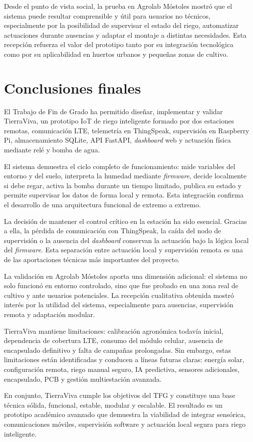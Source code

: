 Desde el punto de vista social, la prueba en Agrolab Móstoles mostró que el sistema puede resultar comprensible y útil para usuarios no técnicos, especialmente por la posibilidad de supervisar el estado del riego, automatizar actuaciones durante ausencias y adaptar el montaje a distintas necesidades. Esta recepción refuerza el valor del prototipo tanto por su integración tecnológica como por su aplicabilidad en huertos urbanos y pequeñas zonas de cultivo.

\section{Conclusiones finales}
\label{sec:conclusiones_finales}

El Trabajo de Fin de Grado ha permitido diseñar, implementar y validar TierraViva, un prototipo IoT de riego inteligente formado por dos estaciones remotas, comunicación LTE, telemetría en ThingSpeak, supervisión en Raspberry Pi, almacenamiento SQLite, API FastAPI, \textit{dashboard} web y actuación física mediante relé y bomba de agua.

El sistema demuestra el ciclo completo de funcionamiento: mide variables del entorno y del suelo, interpreta la humedad mediante \textit{firmware}, decide localmente si debe regar, activa la bomba durante un tiempo limitado, publica su estado y permite supervisar los datos de forma local y remota. Esta integración confirma el desarrollo de una arquitectura funcional de extremo a extremo.

La decisión de mantener el control crítico en la estación ha sido esencial. Gracias a ella, la pérdida de comunicación con ThingSpeak, la caída del nodo de supervisión o la ausencia del \textit{dashboard} conservan la actuación bajo la lógica local del \textit{firmware}. Esta separación entre actuación local y supervisión remota es una de las aportaciones técnicas más importantes del proyecto.

La validación en Agrolab Móstoles aporta una dimensión adicional: el sistema no solo funcionó en entorno controlado, sino que fue probado en una zona real de cultivo y ante usuarios potenciales. La recepción cualitativa obtenida mostró interés por la utilidad del sistema, especialmente para ausencias, supervisión remota y adaptación modular.

TierraViva mantiene limitaciones: calibración agronómica todavía inicial, dependencia de cobertura LTE, consumo del módulo celular, ausencia de encapsulado definitivo y falta de campañas prolongadas. Sin embargo, estas limitaciones están identificadas y conducen a líneas futuras claras: energía solar, configuración remota, riego manual seguro, IA predictiva, sensores adicionales, encapsulado, PCB y gestión multiestación avanzada.

En conjunto, TierraViva cumple los objetivos del TFG y constituye una base técnica sólida, funcional, estable, modular y escalable. El resultado es un prototipo académico avanzado que demuestra la viabilidad de integrar sensórica, comunicaciones móviles, supervisión software y actuación local segura para riego inteligente.